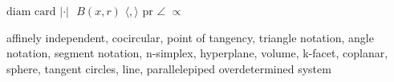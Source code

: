\documentclass[12pt,a4paper]{report}
\let\openright=\clearpage
\theoremstyle{definition}
\theoremstyle{remark}
\theoremstyle{theorem}
\theoremstyle{remark}
\begin{document}


\tableofcontents













\listoffigures

\listoftables



$\mathrm{diam}$ \newline
$\mathrm{card}$ \newline
$|\cdot|$ \newline
$\mathrm{}$ \newline
$B(x,r)$ \newline
$\langle , \rangle$ \newline
$\mathrm{pr}$ \newline
$\angle$
$\propto$

affinely independent, cocircular, point of tangency, triangle notation, angle notation, segment notation, n-simplex, hyperplane, volume, k-facet, coplanar, sphere, tangent circles, line, parallelepiped
overdetermined system





\openright
\end{document}
